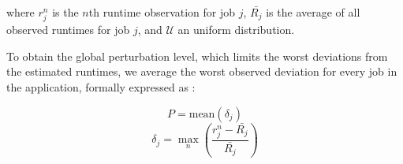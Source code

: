 \documentclass[10pt,conference,compsocconf]{IEEEtran}
\begin{document}
where $r_j^n$ is the $n$th runtime observation for job $j$, $\bar{R_j}$ is the
average of all observed runtimes for job $j$, and $\mathcal{U}$ an uniform distribution.

To obtain the global perturbation level, which limits the worst deviations from
the estimated runtimes, we average the worst observed deviation for every job in
the application, formally expressed as :

\begin{equation}
P = \textrm{mean}(\delta{}_j)
\label{eq:P}
\end{equation}
\begin{equation}
\delta{}_j =
\max_n\left(\frac{r_j^n-\bar{R_j}}{\bar{R_j}}\right)
\label{eq:d}
\end{equation}

\end{document}
